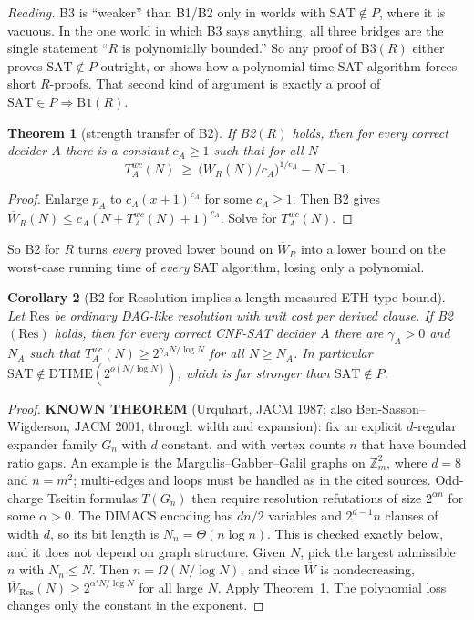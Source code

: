 \documentclass[11pt]{article}
\newtheorem{theorem}{Theorem}
\newtheorem{corollary}[theorem]{Corollary}
\theoremstyle{definition}
\newcommand{\Wb}{\overline W}
\begin{document}
\noindent\emph{Reading.} B3 is ``weaker'' than B1/B2 only in worlds with
$\mathrm{SAT}\notin P$, where it is vacuous. In the one world in which B3
says anything, all three bridges are the single statement ``$R$ is
polynomially bounded.'' So any proof of B3$(R)$ either proves
$\mathrm{SAT}\notin P$ outright, or shows how a polynomial-time SAT algorithm
forces short $R$-proofs. That second kind of argument is exactly a proof of
$\mathrm{SAT}\in P\Rightarrow\mathrm{B1}(R)$.

\begin{theorem}[strength transfer of B2]\label{thm:transfer}
If B2$(R)$ holds, then for every correct decider $A$ there is a constant
$c_A\ge1$ such that for all $N$
\[
 T_A^{wc}(N)\ \ge\ \bigl(\Wb_R(N)/c_A\bigr)^{1/c_A}-N-1 .
\]
\end{theorem}
\begin{proof}
Enlarge $p_A$ to $c_A(x+1)^{c_A}$ for some $c_A\ge1$. Then B2 gives
$\Wb_R(N)\le c_A(N+T_A^{wc}(N)+1)^{c_A}$. Solve for $T_A^{wc}(N)$.
\end{proof}

So B2 for $R$ turns \emph{every} proved lower bound on $\Wb_R$ into a lower
bound on the worst-case running time of \emph{every} SAT algorithm, losing
only a polynomial.

\begin{corollary}[B2 for Resolution implies a length-measured ETH-type bound]\label{cor:eth}
Let $\mathrm{Res}$ be ordinary DAG-like resolution with unit cost per derived
clause. If B2$(\mathrm{Res})$ holds, then for every correct CNF-SAT decider
$A$ there are $\gamma_A>0$ and $N_A$ such that
$T_A^{wc}(N)\ge 2^{\gamma_A N/\log N}$ for all $N\ge N_A$. In particular
$\mathrm{SAT}\notin\mathrm{DTIME}(2^{o(N/\log N)})$, which is far stronger
than $\mathrm{SAT}\notin P$.
\end{corollary}
\begin{proof}
\textbf{KNOWN THEOREM} (Urquhart, JACM 1987; also Ben-Sasson--Wigderson,
JACM 2001, through width and expansion): fix an explicit $d$-regular expander
family $G_n$ with $d$ constant, and with vertex counts $n$ that have bounded
ratio gaps. An example is the Margulis--Gabber--Galil graphs on
$\mathbb Z_m^2$, where $d=8$ and $n=m^2$; multi-edges and loops must be
handled as in the cited sources. Odd-charge Tseitin formulas $T(G_n)$ then
require resolution refutations of size $2^{\alpha n}$ for some $\alpha>0$.
The DIMACS encoding has $dn/2$ variables and $2^{d-1}n$ clauses of width
$d$, so its bit length is $N_n=\Theta(n\log n)$. This is checked exactly
below, and it does not depend on graph structure. Given $N$, pick the
largest admissible $n$ with $N_n\le N$. Then $n=\Omega(N/\log N)$, and since
$\Wb$ is nondecreasing, $\Wb_{\mathrm{Res}}(N)\ge 2^{\alpha' N/\log N}$ for all
large $N$. Apply Theorem~\ref{thm:transfer}. The polynomial loss changes only
the constant in the exponent.
\end{proof}
\end{document}
